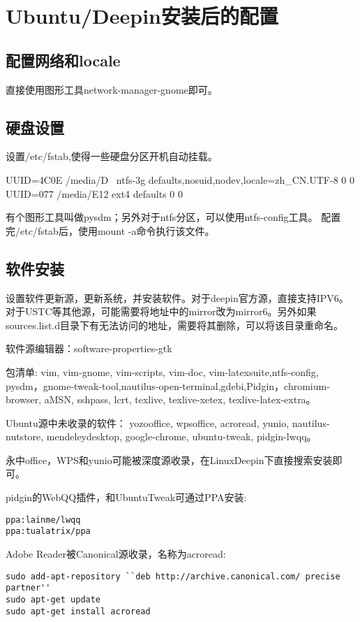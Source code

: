 \section{Ubuntu/Deepin安装后的配置}

\subsection{配置网络和locale}
直接使用图形工具network-manager-gnome即可。

\subsection{硬盘设置}
设置/etc/fstab,使得一些硬盘分区开机自动挂载。
\begin{shellcmd}
UUID=4C0E	/media/D \	
ntfs-3g	defaults,nosuid,nodev,locale=zh_CN.UTF-8	0	0
UUID=077  /media/E12	ext4	defaults	0	0
\end{shellcmd}
有个图形工具叫做pysdm；另外对于ntfs分区，可以使用ntfs-config工具。
配置完/etc/fstab后，使用mount -a命令执行该文件。

\subsection{软件安装}
设置软件更新源，更新系统，并安装软件。对于deepin官方源，直接支持IPV6。对于USTC等其他源，可能需要将地址中的mirror改为mirror6。另外如果sources.list.d目录下有无法访问的地址，需要将其删除，可以将该目录重命名。

软件源编辑器：software-properties-gtk

包清单:
vim, vim-gnome, vim-scripts, vim-doc, vim-latexsuite,ntfs-config, pysdm，gnome-tweak-tool,nautilus-open-terminal,gdebi,Pidgin，chromium-browser, aMSN, sshpass, lcrt, texlive, texlive-xetex, texlive-latex-extra。

Ubuntu源中未收录的软件：
yozooffice, wpsoffice, acroread, yunio, nautilus-nutstore, mendeleydesktop, google-chrome, ubuntu-tweak, pidgin-lwqq。

永中office，WPS和yunio可能被深度源收录，在LinuxDeepin下直接搜索安装即可。

pidgin的WebQQ插件，和UbuntuTweak可通过PPA安装:
\begin{lstlisting}
ppa:lainme/lwqq
ppa:tualatrix/ppa
\end{lstlisting}

Adobe Reader被Canonical源收录，名称为acroread:
\begin{lstlisting}
sudo add-apt-repository ``deb http://archive.canonical.com/ precise partner''
sudo apt-get update
sudo apt-get install acroread
\end{lstlisting}


